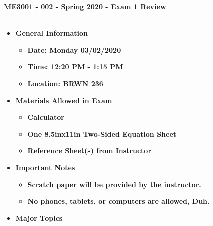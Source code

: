 \documentclass[11pt]{article}
\begin{document}
\textbf{ \LARGE ME3001 - 002 - Spring 2020 - Exam 1 Review  } \\\\

\begin{itemize}
	\item  \textbf{\Large General Information}\\

	\begin{itemize}

		\item  \textbf{\Large Date: Monday 03/02/2020 }\\
		\item  \textbf{\Large Time: 12:20 PM - 1:15 PM }\\
		\item  \textbf{\Large Location: BRWN 236 }\\

	\end{itemize}

		\item  \textbf{\Large Materials Allowed in Exam}\\

	\begin{itemize}

		\item  \textbf{\Large Calculator}\\
		\item  \textbf{\Large One 8.5inx11in Two-Sided Equation Sheet }\\
		\item  \textbf{\Large Reference Sheet(s) from Instructor}\\

	\end{itemize}

\item  \textbf{\Large Important Notes}\\
	\begin{itemize}

		\item  \textbf{\Large Scratch paper will be provided by the instructor.}\\
		\item  \textbf{\Large No phones, tablets, or computers are allowed, Duh.}\\

	\end{itemize}

\item  \textbf{\Large Major Topics}\\
	\begin{itemize}


\end{itemize}
\end{itemize}
\end{document}
